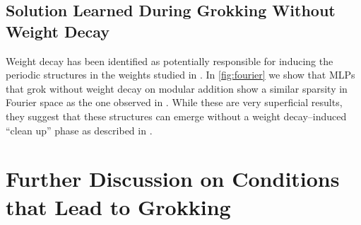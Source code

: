 






\subsection{Solution Learned During Grokking  Without Weight Decay}\label{app:fourier}

 
Weight decay has been identified as potentially responsible for inducing the periodic structures in the weights studied in \cite{Nanda2023-hf}. In \cref{fig:fourier} we show that MLPs that grok without weight decay on modular addition show a similar sparsity in Fourier space as the one observed in \cite{Nanda2023-hf}. While these are very superficial results, they suggest that these structures can emerge without a weight decay--induced ``clean up'' phase as described in \cite{Nanda2023-hf}.

\section{Further Discussion on Conditions that Lead to Grokking}\label{app:further_discussion}
